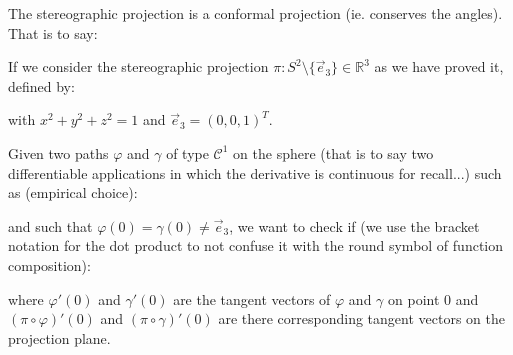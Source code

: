 	\begin{theorem}
	The stereographic projection is a conformal projection (ie. conserves the angles). That is to say:
	
	If we consider the stereographic projection $\pi:S^2 \setminus\{\vec{e}_3\}\in\mathbb{R}^3$ as we have proved it, defined by:
	
	with $x^2+y^2+z^2=1$ and $\vec{e}_3=(0,0,1)^T$.

	Given two paths $\varphi$ and $\gamma$ of type $\mathcal{C}^1$ on the sphere (that is to say two differentiable applications in which the derivative is continuous for recall...) such as (empirical choice):
	
	and such that $\varphi(0)=\gamma(0)\neq \vec{e}_3$, we want to check if (we use the bracket notation for the dot product to not confuse it with the round symbol of function composition):
	
	where $\varphi'(0)$ and $\gamma'(0)$ are the tangent vectors of $\varphi$ and $\gamma$ on point $0$ and $(\pi\circ\varphi)'(0)$ and $(\pi\circ\gamma)'(0)$ are there corresponding tangent vectors on the projection plane.
	\end{theorem}
